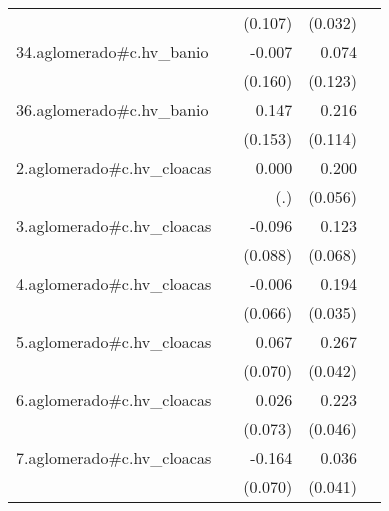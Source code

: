{\begin{longtable}{l*{4}{D{.}{.}{-1}}}
            &                     &     (0.107)         &     (0.032)         &                     \\
\addlinespace
34.aglomerado#c.hv\_banio&                     &      -0.007         &       0.074         &                     \\
            &                     &     (0.160)         &     (0.123)         &                     \\
\addlinespace
36.aglomerado#c.hv\_banio&                     &       0.147         &       0.216         &                     \\
            &                     &     (0.153)         &     (0.114)         &                     \\
\addlinespace
2.aglomerado#c.hv\_cloacas&                     &       0.000         &       0.200\sym{***}&                     \\
            &                     &         (.)         &     (0.056)         &                     \\
\addlinespace
3.aglomerado#c.hv\_cloacas&                     &      -0.096         &       0.123         &                     \\
            &                     &     (0.088)         &     (0.068)         &                     \\
\addlinespace
4.aglomerado#c.hv\_cloacas&                     &      -0.006         &       0.194\sym{***}&                     \\
            &                     &     (0.066)         &     (0.035)         &                     \\
\addlinespace
5.aglomerado#c.hv\_cloacas&                     &       0.067         &       0.267\sym{***}&                     \\
            &                     &     (0.070)         &     (0.042)         &                     \\
\addlinespace
6.aglomerado#c.hv\_cloacas&                     &       0.026         &       0.223\sym{***}&                     \\
            &                     &     (0.073)         &     (0.046)         &                     \\
\addlinespace
7.aglomerado#c.hv\_cloacas&                     &      -0.164\sym{*}  &       0.036         &                     \\
            &                     &     (0.070)         &     (0.041)         &                     \\

\end{longtable}}

